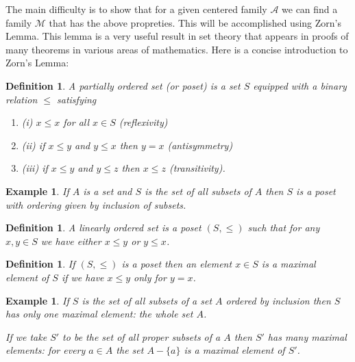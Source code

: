 \documentclass[11pt, letterpaper, oneside]{report}
\theoremstyle{pplain}
\newtheorem{ITERMVALUE THM}[theorem]{Intermediate Value Theorem}
\newtheorem{HEINEBOREL THM}[theorem]{Heine-Borel Theorem}
\newtheorem{UMETR THM}[theorem]{Urysohn Metrization Theorem}
\newtheorem{UMETR2 THM}[theorem]{Urysohn Metrization Theorem (v.2)}
\theoremstyle{ddefinition}
\newtheorem{definition}[theorem]{Definition}
\newtheorem{example}[theorem]{Example}
\theoremstyle{nnn}
\newtheorem{TDA NN}[theorem]{Topological Data Analysis. }
\theoremstyle{eexercise}
\renewcommand{\AA}{{\mathcal A}}
\newcommand{\MM}{{\mathcal M}}
\newcommand{\benu}{\begin{enumerate}}
\newcommand{\eenu}{\end{enumerate}}
\begin{document}
The main difficulty is to show that for a given centered family $\AA$  we can find 
a family $\MM$ that has the above propreties. This will be accomplished 
using  Zorn's Lemma.  This lemma is a very useful result in set theory that appears  
in proofs of many theorems in various areas of mathematics.  Here is a  concise introduction 
to  Zorn's Lemma:


\begin{definition}
\label{PARTIAL ORDER DEF}
A \emph{partially ordered set} (or \emph{poset}) is a set $S$ equipped with a binary relation $\leq$
satisfying 
\benu
\item[(i)] $x\leq x$ for all $x\in S$ (reflexivity)
\item[(ii)] if $x\leq y$ and $y\leq x$ then $y = x$ (antisymmetry)
\item[(iii)] if $x\leq y$ and $y\leq z$ then $x\leq z$ (transitivity).

\eenu

\end{definition}



\begin{example}
If $A$ is a set and $S$ is the set of all subsets of $A$ then $S$ is a poset with ordering 
given by inclusion of subsets. 
\end{example}


\begin{definition}
\label{LINEAR ORDER DEF}
A \emph{linearly ordered set} is a poset $(S, \leq)$ such that for any $x, y\in S$ we have 
either $x\leq y$ or $y\leq x$.
\end{definition}


\begin{definition}
If $(S, \leq)$ is a poset then an element $x\in S$ is a \emph{maximal element} of $S$
if  we have $x\leq y$ only for $y= x$.
\end{definition}



\begin{example}
If $S$ is the set of all subsets of a set $A$ ordered by  inclusion then 
$S$ has only one maximal element: the whole set $A$. 

If we take  $S'$ to be the set of all \emph{proper} subsets of a $A$ then $S'$ has many
maximal elements: for every $a\in A$ the set $A-\{a\}$ is a maximal element of $S'$.
\end{example}
\end{document}

